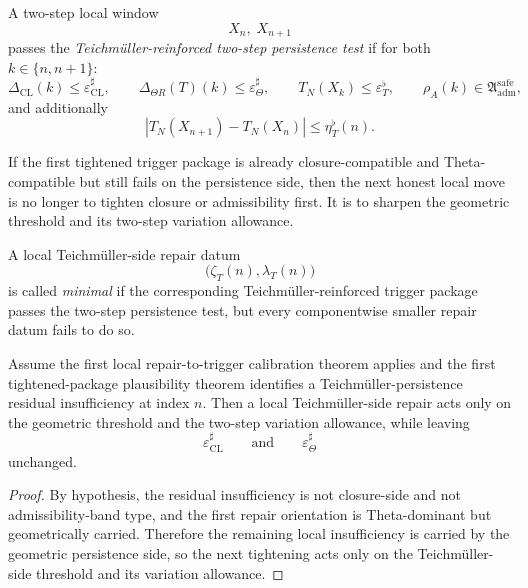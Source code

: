 \begin{definition}\label{def:teichmueller-reinforced-two-step-persistence-test}
A two-step local window
\[
X_n,\;X_{n+1}
\]
passes the \emph{Teichm\"uller-reinforced two-step persistence test} if for both $k\in\{n,n+1\}$:
\[
\Delta_{\mathrm{CL}}(k)\le \varepsilon_{\mathrm{CL}}^{\sharp},
\qquad
\Delta_{\Theta R}(T)(k)\le \varepsilon_{\Theta}^{\sharp},
\qquad
T_N(X_k)\le \varepsilon_T^{\flat},
\qquad
\rho_A(k)\in \mathfrak{A}_{\mathrm{adm}}^{\mathrm{safe}},
\]
and additionally
\[
|T_N(X_{n+1})-T_N(X_n)|\le \eta_T^{\flat}(n).
\]
\end{definition}

\begin{remark}\label{rem:meaning-of-the-teichmueller-side-repair}
If the first tightened trigger package is already closure-compatible and Theta-compatible but still fails on the persistence side, then the next honest local move is no longer to tighten closure or admissibility first. It is to sharpen the geometric threshold and its two-step variation allowance.
\end{remark}

\begin{definition}\label{def:minimal-local-teichmueller-side-repair}
A local Teichm\"uller-side repair datum
\[
\bigl(\zeta_T(n),\lambda_T(n)\bigr)
\]
is called \emph{minimal} if the corresponding Teichm\"uller-reinforced trigger package passes the two-step persistence test, but every componentwise smaller repair datum fails to do so.
\end{definition}

\begin{proposition}\label{prop:teichmueller-side-repair-leaves-closure-and-theta-tightening-fixed}
Assume the first local repair-to-trigger calibration theorem applies and the first tightened-package plausibility theorem identifies a Teichm\"uller-persistence residual insufficiency at index $n$.
Then a local Teichm\"uller-side repair acts only on the geometric threshold and the two-step variation allowance, while leaving
\[
\varepsilon_{\mathrm{CL}}^{\sharp}
\qquad\text{and}\qquad
\varepsilon_{\Theta}^{\sharp}
\]
unchanged.
\end{proposition}

\begin{proof}
By hypothesis, the residual insufficiency is not closure-side and not admissibility-band type, and the first repair orientation is Theta-dominant but geometrically carried. Therefore the remaining local insufficiency is carried by the geometric persistence side, so the next tightening acts only on the Teichm\"uller-side threshold and its variation allowance.
\end{proof}

